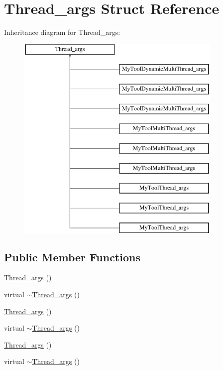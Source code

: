 \hypertarget{structThread__args}{\section{Thread\-\_\-args Struct Reference}
\label{structThread__args}
}
Inheritance diagram for Thread\-\_\-args\-:\begin{figure}[H]
\begin{center}
\leavevmode
\includegraphics[height=10.000000cm]{structThread__args}
\end{center}
\end{figure}
\subsection*{Public Member Functions}
\begin{DoxyCompactItemize}
\item 
\hyperlink{structThread__args_a399b672e0f4f137fe52c141bd8c38eb1}{Thread\-\_\-args} ()
\item 
virtual \hyperlink{structThread__args_ad786e0c55b4e44bc04d9ba3b813bace1}{$\sim$\-Thread\-\_\-args} ()
\item 
\hyperlink{structThread__args_a399b672e0f4f137fe52c141bd8c38eb1}{Thread\-\_\-args} ()
\item 
virtual \hyperlink{structThread__args_ad786e0c55b4e44bc04d9ba3b813bace1}{$\sim$\-Thread\-\_\-args} ()
\item 
\hyperlink{structThread__args_a399b672e0f4f137fe52c141bd8c38eb1}{Thread\-\_\-args} ()
\item 
virtual \hyperlink{structThread__args_ad786e0c55b4e44bc04d9ba3b813bace1}{$\sim$\-Thread\-\_\-args} ()
\end{DoxyCompactItemize}
